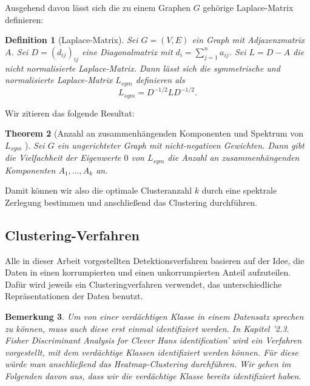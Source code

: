 \documentclass[twoside, 12pt,a4paper]{book}
\def\emph#1{\textit{#1}}
\newtheorem{theorem}{Theorem}[subsection]
\newtheorem{definition}[theorem]{Definition}
\newtheorem{remark}[theorem]{Bemerkung}
\numberwithin{equation}{section}
\begin{document}
	
	
	\noindent Ausgehend davon lässt sich die zu einem Graphen $G$ gehörige Laplace-Matrix definieren:
	
	\begin{definition}[Laplace-Matrix]
		Sei $G=(V,E)$ ein Graph mit Adjazenzmatrix $A$. Sei $D = (d_{ij})_{ij}$ eine Diagonalmatrix mit $d_{i} = \sum_{j=1}^n{a_{ij}}$. Sei $L=D-A$ die \emph{nicht normalisierte Laplace-Matrix}. Dann lässt sich die symmetrische und normalisierte Laplace-Matrix $L_{sym}$ definieren als
		\begin{equation}
		L_{sym} = D^{-1/2}LD^{-1/2}.
		\end{equation}
	\end{definition}
	
	
	\noindent Wir zitieren das folgende Resultat:
	
	\begin{theorem}[Anzahl an zusammenhängenden Komponenten und Spektrum von $L_{sym}$ \cite{spectralClustering_tut}]
		Sei $G$ ein ungerichteter Graph mit nicht-negativen Gewichten. Dann gibt die Vielfachheit der Eigenwerte $0$ von $L_{sym}$ die Anzahl an zusammenhängenden Komponenten $A_1,..., A_k$ an.
	\end{theorem}
	
	\noindent Damit können wir also die optimale Clusteranzahl $k$ durch eine spektrale Zerlegung bestimmen und anschließend das Clustering durchführen.
	
	\subsection{Clustering-Verfahren}
	Alle in dieser Arbeit vorgestellten Detektionsverfahren basieren auf der Idee, die Daten in einen korrumpierten und einen unkorrumpierten Anteil aufzuteilen. Dafür wird jeweils ein Clusteringverfahren verwendet, das unterschiedliche Repräsentationen der Daten benutzt. 
	
	\begin{remark}
		Um von einer verdächtigen Klasse in einem Datensatz sprechen zu können, muss auch diese erst einmal identifiziert werden.
		In \cite{imagenet_unhansed_v1} Kapitel '2.3. Fisher Discriminant Analysis for Clever Hans
		identification' wird ein Verfahren vorgestellt, mit dem verdächtige Klassen identifiziert werden können. Für diese würde man anschließend das Heatmap-Clustering durchführen. Wir gehen im Folgenden davon aus, dass wir die verdächtige Klasse bereits identifiziert haben.
	\end{remark}
\end{document}
